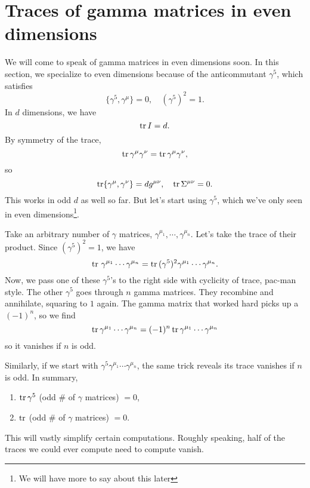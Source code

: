 \documentclass[main.tex]{subfiles}
\begin{document}
\section{Traces of gamma matrices in even dimensions}
We will come to speak of gamma matrices in even dimensions soon. In this section, we specialize to even dimensions because of the anticommutant $\gamma^5$, which satisfies
\[
\{\gamma^5,\gamma^\mu\} = 0, \quad (\gamma^5)^2 = 1.
\]
In $d$ dimensions, we have
\[
\tr I = d.
\]
By symmetry of the trace,
\[
\tr \gamma^{\mu} \gamma^\nu = \tr \gamma^\mu \gamma^\nu,
\]
so
\[
\tr \{\gamma^\mu,\gamma^\nu\} = d g^{\mu \nu}, \quad \tr \Sigma^{\mu \nu} = 0.
\]
This works in odd $d$ as well so far. But let's start using $\gamma^5$, which we've only seen in even dimensions\footnote{We will have more to say about this later}. 

Take an arbitrary number of $\gamma$ matrices, $\gamma^{\mu_1},\cdots,\gamma^{\mu_n}$. Let's take the trace of their product. Since $(\gamma^5)^2 = 1$, we have
\[
\tr \, \gamma^{\mu_{1}} \cdots \gamma^{\mu_n} = \tr \, (\gamma^5)^2 \gamma^{\mu_1} \cdots \gamma^{\mu_n}.
\]
Now, we pass one of these $\gamma^5$'s to the right side with cyclicity of trace, pac-man style. The other $\gamma^5$ goes through $n$ gamma matrices. They recombine and annihilate, squaring to $1$ again. The gamma matrix that worked hard picks up a $(-1)^n$, so we find
\[
\tr \gamma^{\mu_1} \cdots \gamma^{\mu_n} = (-1)^n \tr \gamma^{\mu_1} \cdots \gamma^{\mu_n}
\]
so it vanishes if $n$ is odd.

Similarly, if we start with $\gamma^5 \gamma^{\mu_1} \cdots \gamma^{\mu_n}$, the same trick reveals its trace vanishes if $n$ is odd. In summary,
\begin{enumerate}
\item $\tr \gamma^5$ (odd \# of $\gamma$ matrices) $ = 0$,

\item $\tr$ (odd \# of $\gamma$ matrices) $= 0$.
\end{enumerate}
This will vastly simplify certain computations. Roughly speaking, half of the traces we could ever compute need to compute vanish.
\end{document}
